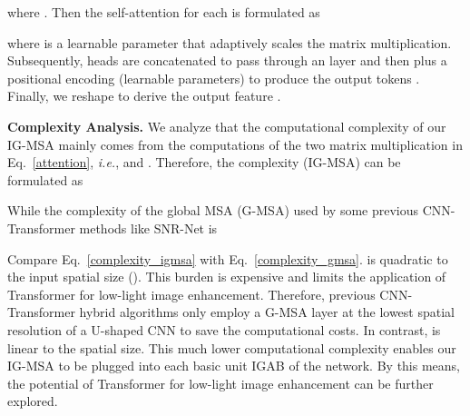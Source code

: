 \documentclass[10pt,twocolumn,letterpaper]{article}
\begin{document}
where . Then the self-attention for each  is formulated as 
\vspace{-0.5mm}

where  is a learnable parameter that adaptively scales the matrix multiplication. Subsequently,  heads are concatenated to pass through an  layer and then plus a positional encoding  (learnable parameters) to produce the output tokens . Finally, we reshape  to derive the output feature .

\vspace{1mm}
\noindent\textbf{Complexity Analysis.} We analyze that the computational complexity of our IG-MSA mainly comes from the  computations of the two matrix multiplication in Eq.~\eqref{attention}, \emph{i.e.},  and . Therefore, the complexity ({IG-MSA}) can be formulated as 
\vspace{-1.2mm}

While the complexity of the global MSA (G-MSA) used by some previous CNN-Transformer methods like SNR-Net is
\vspace{-2.2mm}

Compare Eq.~\eqref{complexity_igmsa} with Eq.~\eqref{complexity_gmsa}.  is quadratic to the input spatial size (). This burden is expensive and limits the application of Transformer for low-light image enhancement. Therefore, previous CNN-Transformer hybrid algorithms only employ a G-MSA layer at the lowest spatial resolution of a U-shaped CNN to save the computational costs. In contrast,  is linear to the spatial size. This much lower computational complexity enables our IG-MSA to be plugged into each basic unit IGAB of the network. By this means, the potential of Transformer for low-light image enhancement can be further explored.
\end{document}
